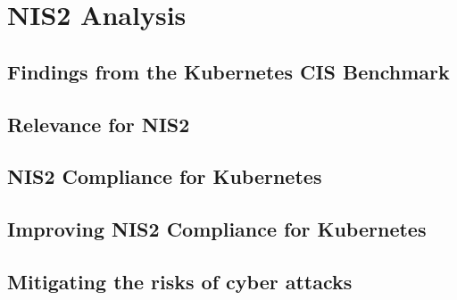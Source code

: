 %
%

\pagebreak
\section{NIS2 Analysis}

\onehalfspacing

\subsection{Findings from the Kubernetes CIS Benchmark}

\subsection{Relevance for NIS2}

\subsection{NIS2 Compliance for Kubernetes}

\subsection{Improving NIS2 Compliance for Kubernetes}

\subsection{Mitigating the risks of cyber attacks}
